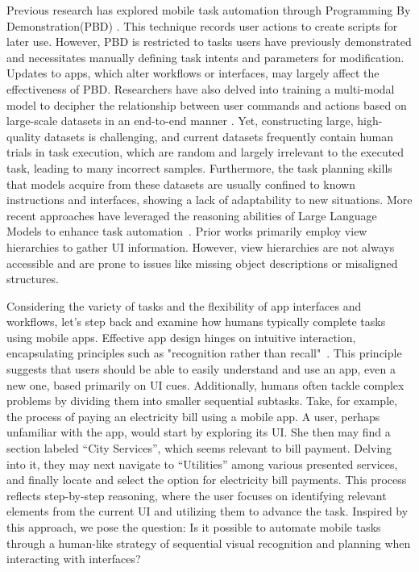 Previous research has explored mobile task automation through Programming By Demonstration(PBD) \cite{li2017sugilite,li2018kite,sereshkeh2020vasta,riva2021etna,vu2023voicify}. This technique records user actions to create scripts for later use. However, PBD is restricted to tasks users have previously demonstrated and necessitates manually defining task intents and parameters for modification. Updates to apps, which alter workflows or interfaces, may largely affect the effectiveness of PBD. Researchers have also delved into training a multi-modal model to decipher the relationship between user commands and actions based on large-scale datasets in an end-to-end manner \cite{li2020mapping,sun2022meta,li2023spotlight,zhan2023you}. Yet, constructing large, high-quality datasets is challenging, and current datasets frequently contain human trials in task execution, which are random and largely irrelevant to the executed task, leading to many incorrect samples. Furthermore, the task planning skills that models acquire from these datasets are usually confined to known instructions and interfaces, showing a lack of adaptability to new situations. More recent approaches have leveraged the reasoning abilities of Large Language Models to enhance task automation~\cite{wang2023enabling,wen2023empowering}. Prior works primarily employ view hierarchies to gather UI information. However, view hierarchies are not always accessible and are prone to issues like missing object descriptions or misaligned structures.

Considering the variety of tasks and the flexibility of app interfaces and workflows, let's step back and examine how humans typically complete tasks using mobile apps. Effective app design hinges on intuitive interaction, encapsulating principles such as "recognition rather than recall"~\cite{nielsen1994enhancing}. This principle suggests that users should be able to easily understand and use an app, even a new one, based primarily on UI cues.
Additionally, humans often tackle complex problems by dividing them into smaller sequential subtasks. Take, for example, the process of paying an electricity bill using a mobile app. A user, perhaps unfamiliar with the app, would start by exploring its UI. She then may find a section labeled ``City Services'', which seems relevant to bill payment. Delving into it, they may next navigate to ``Utilities'' among various presented services, and finally locate and select the option for electricity bill payments. This process reflects step-by-step reasoning, where the user focuses on identifying relevant elements from the current UI and utilizing them to advance the task. Inspired by this approach, we pose the question: Is it possible to automate mobile tasks through a human-like strategy of sequential visual recognition and planning when interacting with interfaces?

